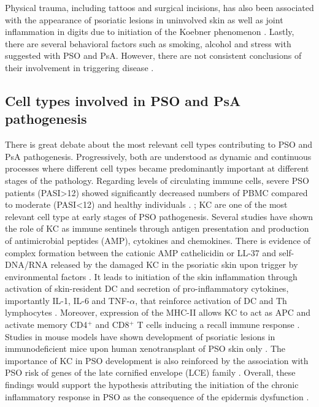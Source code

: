 Physical trauma, including tattoos and surgical incisions, has also been associated with the appearance of psoriatic lesions in uninvolved skin as well as joint inflammation in digits \parencite {Nestle2009} due to initiation of the Koebner phenomenon \parencite{Weiss2002}. Lastly, there are several behavioral factors such as smoking, alcohol and stress with suggested with PSO and PsA. However, there are not consistent conclusions of their involvement in triggering disease \parencite{Meglio2014}.

\subsection{Cell types involved in PSO and PsA pathogenesis}

There is great debate about the most relevant cell types contributing to PSO and PsA pathogenesis. Progressively, both are understood as dynamic and continuous processes where different cell types became predominantly important at different stages of the pathology. Regarding levels of circulating immune cells, severe PSO patients (PASI>12) showed significantly decreased numbers of PBMC compared to moderate (PASI<12) and healthy individuals \parencite{Langewouters2008}.
;
KC are one of the most relevant cell type at early stages of PSO pathogenesis. Several studies have shown the role of KC as immune sentinels through antigen presentation and production of antimicrobial peptides (AMP), cytokines and chemokines. There is evidence of complex formation between the cationic AMP cathelicidin or LL-37 and self-DNA/RNA released by the damaged KC in the psoriatic skin upon trigger by environmental factors \parencite{Lande2007}. It leads to initiation of the skin inflammation through activation of skin-resident DC \parencite{Nestle2005} and secretion of pro-inflammatory cytokines, importantly IL-1, IL-6 and TNF-$\alpha$, that reinforce activation of DC and Th lymphocytes \parencite{Feldmeyer2007, Arend2008, Nestle2009}. Moreover, expression of the MHC-II allows KC to act as APC and activate memory CD4$^+$ and CD8$^+$ T cells inducing a recall immune response \parencite{Black2007}. Studies in mouse models have shown development of psoriatic lesions in immunodeficient mice upon human xenotransplant of PSO skin only \parencite{Boyman2004}. The importance of KC in PSO development is also reinforced by the association with PSO risk of genes of the late cornified envelope (LCE) family \parencite{Tsoi2012}. Overall, these findings would support the hypothesis attributing the initiation of the chronic inflammatory response in PSO as the consequence of the epidermis dysfunction . 

